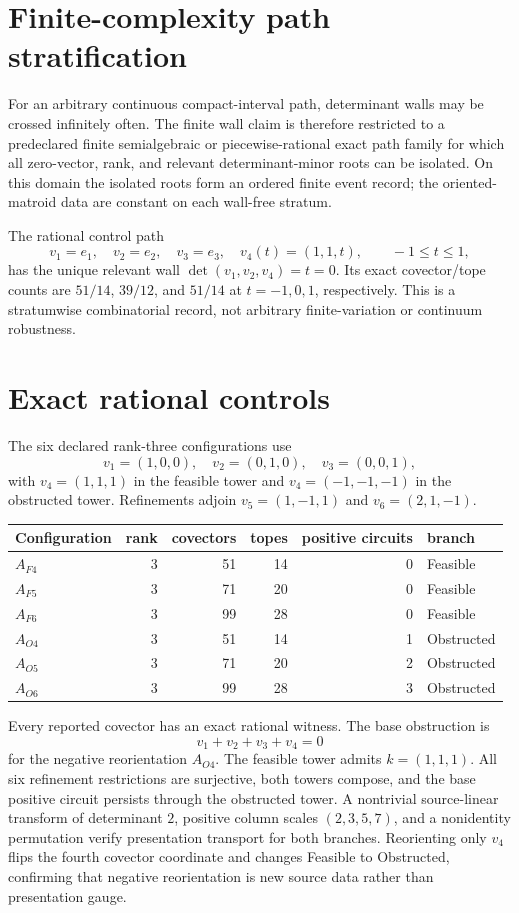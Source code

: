 \documentclass[11pt]{article}
\begin{document}
\section{Finite-complexity path stratification}

For an arbitrary continuous compact-interval path, determinant walls may be
crossed infinitely often.  The finite wall claim is therefore restricted to a
predeclared finite semialgebraic or piecewise-rational exact path family for
which all zero-vector, rank, and relevant determinant-minor roots can be
isolated.  On this domain the isolated roots form an ordered finite event
record; the oriented-matroid data are constant on each wall-free stratum.

The rational control path
\[
 v_1=e_1,\quad v_2=e_2,\quad v_3=e_3,\quad
 v_4(t)=(1,1,t),\qquad -1\le t\le1,
\]
has the unique relevant wall
$\det(v_1,v_2,v_4)=t=0$.  Its exact covector/tope counts are
$51/14$, $39/12$, and $51/14$ at $t=-1,0,1$, respectively.  This is a
stratumwise combinatorial record, not arbitrary finite-variation or continuum
robustness.

\section{Exact rational controls}

The six declared rank-three configurations use
\[
 v_1=(1,0,0),\quad v_2=(0,1,0),\quad v_3=(0,0,1),
\]
with $v_4=(1,1,1)$ in the feasible tower and
$v_4=(-1,-1,-1)$ in the obstructed tower.  Refinements adjoin
$v_5=(1,-1,1)$ and $v_6=(2,1,-1)$.

\begin{center}
\begin{tabular}{lrrrrl}
\toprule
Configuration & rank & covectors & topes & positive circuits & branch\\
\midrule
$A_{F4}$ & 3 & 51 & 14 & 0 & Feasible\\
$A_{F5}$ & 3 & 71 & 20 & 0 & Feasible\\
$A_{F6}$ & 3 & 99 & 28 & 0 & Feasible\\
$A_{O4}$ & 3 & 51 & 14 & 1 & Obstructed\\
$A_{O5}$ & 3 & 71 & 20 & 2 & Obstructed\\
$A_{O6}$ & 3 & 99 & 28 & 3 & Obstructed\\
\bottomrule
\end{tabular}
\end{center}

Every reported covector has an exact rational witness.  The base obstruction is
\[
 v_1+v_2+v_3+v_4=0
\]
for the negative reorientation $A_{O4}$.  The feasible tower admits
$k=(1,1,1)$.  All six refinement restrictions are surjective, both towers
compose, and the base positive circuit persists through the obstructed tower.
A nontrivial source-linear transform of determinant $2$, positive column scales
$(2,3,5,7)$, and a nonidentity permutation verify presentation transport for
both branches.  Reorienting only $v_4$ flips the fourth covector coordinate and
changes Feasible to Obstructed, confirming that negative reorientation is new
source data rather than presentation gauge.
\end{document}
